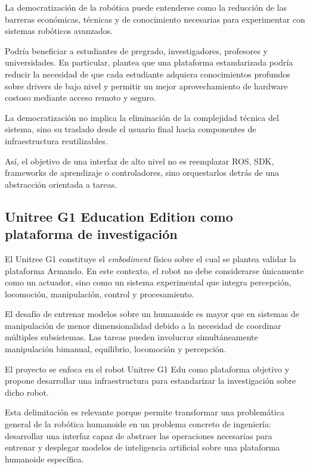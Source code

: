 \documentclass[stu,12pt,floatsintext]{apa7}
\begin{document}
La democratización de la robótica puede entenderse como la reducción de las barreras económicas, técnicas y de conocimiento necesarias para experimentar con sistemas robóticos avanzados.

Podría beneficiar a estudiantes de pregrado, investigadores, profesores y universidades. En particular, plantea que una plataforma estandarizada podría reducir la necesidad de que cada estudiante adquiera conocimientos profundos sobre drivers de bajo nivel y permitir un mejor aprovechamiento de hardware costoso mediante acceso remoto y seguro.

La democratización no implica la eliminación de la complejidad técnica del sistema, sino su traslado desde el usuario final hacia componentes de infraestructura reutilizables.

Así, el objetivo de una interfaz de alto nivel no es reemplazar ROS, SDK, frameworks de aprendizaje o controladores, sino orquestarlos detrás de una abstracción orientada a tareas.

\subsection{Unitree G1 Education Edition como plataforma de investigación}

El Unitree G1 constituye el \textit{embodiment} físico sobre el cual se plantea validar la plataforma Armando. En este contexto, el robot no debe considerarse únicamente como un actuador, sino como un sistema experimental que integra percepción, locomoción, manipulación, control y procesamiento.

El desafío de entrenar modelos sobre un humanoide es mayor que en sistemas de manipulación de menor dimensionalidad debido a la necesidad de coordinar múltiples subsistemas. Las tareas pueden involucrar simultáneamente manipulación bimanual, equilibrio, locomoción y percepción.

El proyecto se enfoca en el robot Unitree G1 Edu como plataforma objetivo y propone desarrollar una infraestructura para estandarizar la investigación sobre dicho robot.

Esta delimitación es relevante porque permite transformar una problemática general de la robótica humanoide en un problema concreto de ingeniería: desarrollar una interfaz capaz de abstraer las operaciones necesarias para entrenar y desplegar modelos de inteligencia artificial sobre una plataforma humanoide específica.
\end{document}

